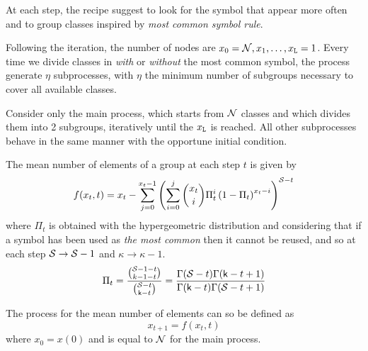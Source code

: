 At each step, the recipe suggest to look for the symbol that appear more often and to group classes inspired by \textit{most common symbol rule}.

Following the iteration, the number of nodes are $ x_0 = \mathcal N, x_1, \dots , x_{\mathtt L} = 1$. Every time we divide classes in \textit{with} or \textit{without} the most common symbol, the process generate $\eta$ subprocesses, with $\eta$ the minimum number of subgroups necessary to cover all available classes.

Consider only the main process, which starts from $\mathcal N$ classes and which divides them into 2 subgroups, iteratively until the $x_{\mathtt L}$ is reached. All other subprocesses behave in the same manner with the opportune initial condition.

The mean number of elements of a group at each step $t$ is given by
\[ f(x_t, t) = x_t - \sum_{j=0}^{x_t-1} \left( \sum_{i=0}^{j} \binom{x_t}{i} \Pi_t^i \left( 1 - \Pi_t \right)^{x_t-i} \right)^{\mathcal S-t} \]
where $\Pi_t$ is obtained with the hypergeometric distribution and considering that if a symbol has been used as \textit{the most common} then it cannot be reused, and so at each step $\mathcal S \to \mathcal S -1$ and $\kappa \to \kappa -1$.
\[ \Pi_t = \frac{\binom{\mathcal S-1-t}{k-1-t}}{\binom{\mathcal S-t}{\mathsf k-t}} = \frac{\Gamma(\mathcal S-t)\Gamma(\mathsf k-t+1)}{\Gamma(\mathsf k-t)\Gamma(\mathcal S-t+1)}\]

The process for the mean number of elements can so be defined as
\[ x_{t+1} = f(x_{t},t) \]
where $x_0=x(0)$ and is equal to $\mathcal N$ for the main process.
%
\comment{
}
